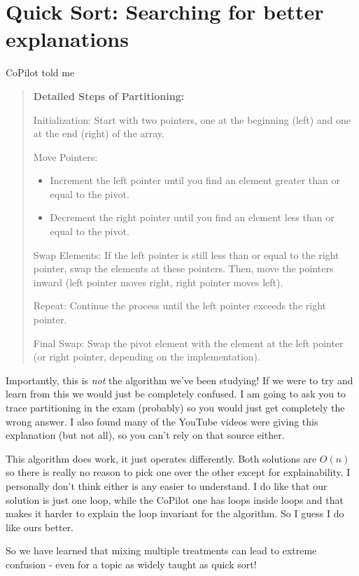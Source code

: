 \documentclass[twoside=false,DIV=14]{scrartcl}
\begin{document}
\section{Quick Sort: Searching for better explanations}
CoPilot told me
\begin{quote}
    \textbf{Detailed Steps of Partitioning:}

    Initialization: Start with two pointers, one at the beginning (left) and one at the end (right) of the array.

    Move Pointers:
    \begin{itemize}
        \item Increment the left pointer until you find an element greater than or equal to the pivot.
        \item Decrement the right pointer until you find an element less than or equal to the pivot.
    \end{itemize}
    Swap Elements: If the left pointer is still less than or equal to the right pointer, swap the elements at these pointers. Then, move the pointers inward (left pointer moves right, right pointer moves left).

    Repeat: Continue the process until the left pointer exceeds the right pointer.

    Final Swap: Swap the pivot element with the element at the left pointer (or right pointer, depending on the implementation).
\end{quote}

Importantly, this is \emph{not} the algorithm we've been studying!  If we were to try and learn from this we would just be completely confused.  I am going to ask you to trace partitioning in the exam (probably) so you would just get completely the wrong answer.  I also found many of the YouTube videos were giving this explanation (but not all), so you can't rely on that source either.

This algorithm does work, it just operates differently.  Both solutions are $O(n)$ so there is really no reason to pick one over the other except for explainability.  I personally don't think either is any easier to understand.  I do like that our solution is just one loop, while the CoPilot one has loops inside loops and that makes it harder to explain the loop invariant for the algorithm.  So I guess I do like ours better.

So we have learned that mixing multiple treatments can lead to extreme confusion - even for a topic as widely taught as quick sort!
\end{document}
